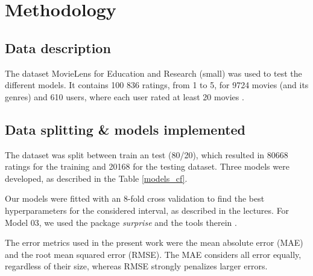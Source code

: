 \documentclass[conference]{IEEEtran}
\begin{document}
\section{Methodology}


\subsection{Data description}

The dataset MovieLens for Education and Research (small) was used to test the different models. It contains 100 836 ratings, from 1 to 5, for 9724 movies (and its genres) and 610 users, where each user rated at least 20 movies \cite{MovieLens}. 

\subsection{Data splitting \& models implemented}

The dataset was split between train an test (80/20), which resulted in 80668 ratings for the training and 20168 for the testing dataset. Three models were developed, as described in the Table \ref{models_cf}.

\begin{table}[H]
\centering
\caption{Models implemented to the MovieLens dataset.}
\label{models_cf}
\end{table}

Our models were fitted with an 8-fold cross validation to find the best hyperparameters for the considered interval, as described in the lectures. For Model 03, we used the package \textit{surprise} and the tools therein \cite{surprise}. 

The error metrics used in the present work were the mean absolute error (MAE) and the root mean squared error (RMSE). The MAE considers all error equally, regardless of their size, whereas RMSE strongly penalizes larger errors.
\end{document}
